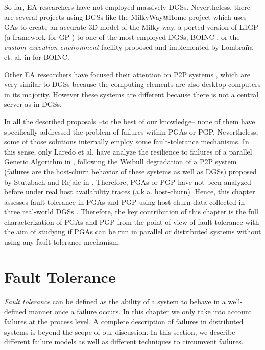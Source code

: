 \documentclass[graybox]{sty/svmult}
\begin{document}
So far, EA researchers have not employed massively DGSs. Nevertheless, there are several projects using DGSs like 
the MilkyWay@Home project \cite{milkywayathome} which uses GAs to create an accurate 3D model of the Milky way, a ported version 
of LilGP \cite{maeb-2007-boinc}(a framework for GP \cite{lilgp}) to one of the most employed DGSs, BOINC
\cite{boinc-paper}, or the \emph{custom execution environment} facility proposed and implemented by Lombraña et. al. in \cite{ibergrid-2008,pdp-2009} 
for BOINC.

Other EA researchers have focused their attention on P2P systems \cite{juanlu-ppsn}, which are very similar to DGSs because
the computing elements are also desktop computers in its majority. However these systems are different because there is not a central server as in DGSs.

In all the described proposals --to the best of our knowledge-- none of them have specifically
addressed the problem of failures within PGAs or PGP. Nevertheless, some of those solutions internally employ some fault-tolerance
mechanisms. In this sense, only Laredo et al. have analyze the resilience to failures of a parallel Genetic Algorithm 
in \cite{laredo08:churn}, following the Weibull degradation of a P2P system (failures are the host-churn behavior of these
systems as well as DGSs) proposed by Stutzbach and Rejaie in \cite{Stutzbach06Understanding}. 
Therefore, PGAs or PGP have not been analyzed before under real host availability traces
(a.k.a. host-churn). Hence, this chapter assesses fault tolerance in PGAs and PGP using host-churn data collected in three real-world DGSs \cite{traces-dgc}.
Therefore, the key contribution of this chapter is the full characterization of PGAs and PGP from the point of view of fault-tolerance with the
aim of studying if PGAs can be run in parallel or distributed systems without using any fault-tolerance mechanism. 

\section{Fault Tolerance}
\label{faulttolerance}

\emph{Fault tolerance} can be defined as the ability of a system to behave in a
well-defined manner once a failure occurs. In this chapter we only take
into account failures at the process level. A complete description of
failures in distributed systems is beyond the scope of our discussion. In this section, we describe different failure models as well as different techniques to circumvent failures.
\end{document}
